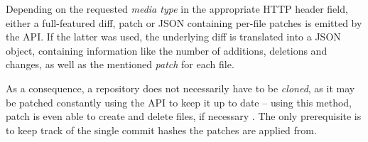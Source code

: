 Depending on the requested \emph{media type} in the appropriate HTTP header field, either a full-featured diff, patch or JSON containing per-file patches is emitted by the API. If the latter was used, the underlying diff is translated into a JSON object, containing information like the number of additions, deletions and changes, as well as the mentioned \emph{patch} for each file.

As a consequence, a repository does not necessarily have to be \emph{cloned}, as it may be patched constantly using the API to keep it up to date -- using this method, patch is even able to create and delete files, if necessary \cite[57]{mackenzie2003comparing}. The only prerequisite is to keep track of the single commit hashes the patches are applied from.
